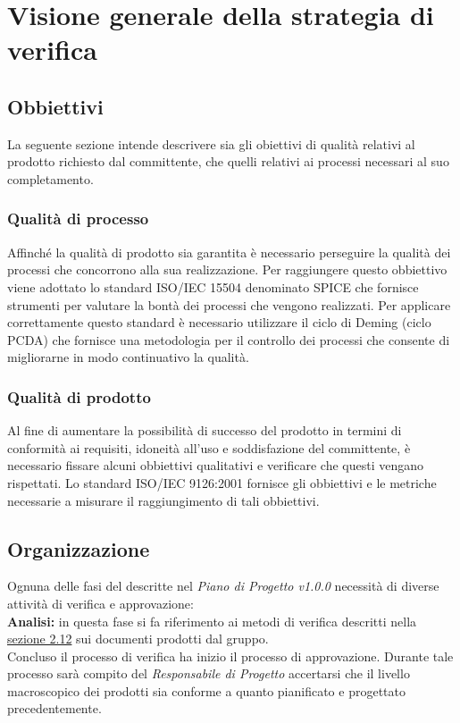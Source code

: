 \chapter{Visione generale della strategia di verifica}
\section{Obbiettivi}
La seguente sezione intende descrivere sia gli obiettivi di qualità relativi al prodotto richiesto dal committente, che quelli relativi ai processi necessari al suo completamento.
\subsection{Qualità di processo}
Affinché la qualità di prodotto sia garantita è necessario perseguire la qualità dei processi che concorrono alla sua realizzazione. Per raggiungere questo obbiettivo viene adottato lo standard ISO/IEC 15504 denominato SPICE che fornisce strumenti per valutare la bontà dei processi che vengono realizzati.
Per applicare correttamente questo standard è necessario utilizzare il ciclo di Deming (ciclo PCDA) che fornisce una metodologia per il controllo dei processi che consente di migliorarne in modo continuativo la qualità. 
\subsection{Qualità di prodotto}
Al fine di aumentare la possibilità di successo del prodotto in termini di conformità ai requisiti, idoneità all'uso e soddisfazione del committente, è necessario fissare alcuni obbiettivi qualitativi e verificare che questi vengano rispettati.
Lo standard ISO/IEC 9126:2001 fornisce gli obbiettivi e le metriche necessarie a misurare il raggiungimento di tali obbiettivi.
\section{Organizzazione}
Ognuna delle fasi del  descritte nel \textit{Piano di Progetto v1.0.0} necessità di diverse attività di verifica e approvazione:\\\newline
 \textbf{Analisi:} in questa fase si fa riferimento ai metodi di verifica descritti nella \hyperref[Metodi]{sezione 2.12} sui documenti prodotti dal gruppo.\\ \newline
Concluso il processo di verifica ha inizio il processo di approvazione. Durante tale processo sarà compito del \textit{Responsabile di Progetto} accertarsi che il livello macroscopico dei prodotti sia conforme a quanto pianificato e progettato precedentemente.
